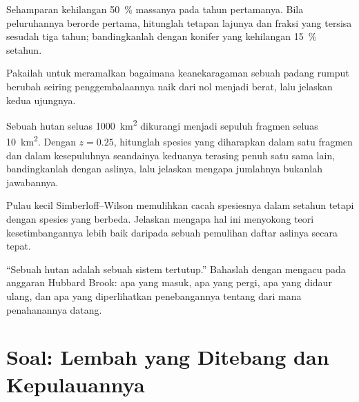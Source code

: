 \begin{exercise}[$\star\star$]\label{exo:b1:ecosystem-dynamics:8}
Sehamparan   kehilangan \qty{50}{\%} massanya pada tahun
pertamanya. Bila peluruhannya berorde pertama, hitunglah tetapan
lajunya dan fraksi yang tersisa sesudah tiga tahun; bandingkanlah
dengan  konifer yang kehilangan \qty{15}{\%} setahun.
\end{exercise}

\begin{exercise}[$\star\star$]\label{exo:b1:ecosystem-dynamics:9}
Pakailah  untuk meramalkan bagaimana
keanekaragaman sebuah padang rumput berubah seiring penggembalaannya
naik dari nol menjadi berat, lalu jelaskan kedua ujungnya.
\end{exercise}

\begin{exercise}[$\star\star\star$]\label{exo:b1:ecosystem-dynamics:10}
Sebuah hutan seluas \qty{1000}{km^2} dikurangi menjadi sepuluh fragmen
seluas \qty{10}{km^2}. Dengan $z = 0.25$, hitunglah spesies yang
diharapkan dalam satu fragmen dan dalam kesepuluhnya seandainya
keduanya terasing penuh satu sama lain, bandingkanlah dengan aslinya,
lalu jelaskan mengapa jumlahnya bukanlah jawabannya.
\end{exercise}

\begin{exercise}[$\star\star\star$]\label{exo:b1:ecosystem-dynamics:11}
Pulau kecil Simberloff--Wilson memulihkan cacah spesiesnya dalam
setahun tetapi dengan spesies yang berbeda. Jelaskan mengapa hal ini
menyokong teori kesetimbangannya lebih baik daripada sebuah pemulihan
daftar aslinya secara tepat.
\end{exercise}

\begin{exercise}[$\star\star\star$]\label{exo:b1:ecosystem-dynamics:12}
``Sebuah hutan  adalah sebuah sistem tertutup.'' Bahaslah
dengan mengacu pada anggaran Hubbard Brook: apa yang masuk, apa yang
pergi, apa yang didaur ulang, dan apa yang diperlihatkan penebangannya
tentang dari mana penahanannya datang.
\end{exercise}

\section{Soal: Lembah yang Ditebang dan Kepulauannya}

